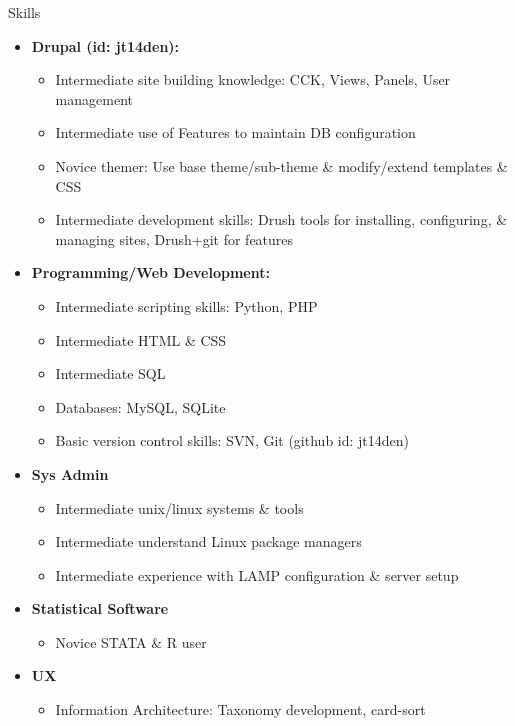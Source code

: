 \documentclass[11pt,oneside]{article}
\newenvironment{ressection}[1]{
	\vspace{4pt}
	{\fontfamily{phv}\selectfont\Large#1}
	\begin{itemize}
	\vspace{3pt}
}{
	\end{itemize}
}
\newcommand{\resitem}[1]{
	\vspace{-4pt}
	\item \begin{flushleft} #1 \end{flushleft}
}
\newcommand{\ressubitem}[1]{
	\vspace{-1pt}
	\item \begin{flushleft} #1 \end{flushleft}
}
\newenvironment{reslist}[1]{
	\resitem{\textbf{#1}}
	\vspace{-5pt}
	\begin{itemize}
}{
	\end{itemize}
}
\begin{document}
\begin{ressection}{Skills}

	\begin{reslist}{Drupal (id: jt14den):}

		\ressubitem{Intermediate site building knowledge: CCK, Views, Panels, User management }

        \ressubitem{Intermediate use of Features to maintain DB configuration}

		\ressubitem{Novice themer: Use base theme/sub-theme \& modify/extend templates \& CSS}

    \ressubitem{Intermediate development skills: Drush tools for installing, configuring, \& managing sites, Drush+git for features}
    
	\end{reslist}

	\begin{reslist}{Programming/Web Development:}

		\ressubitem{Intermediate scripting skills: Python, PHP}

		\ressubitem{Intermediate HTML \& CSS}
		
		\ressubitem{Intermediate SQL}
		
		\ressubitem{Databases: MySQL, SQLite}
		
		\ressubitem{Basic version control skills: SVN, Git (github id: jt14den)}

	\end{reslist}
	
	\begin{reslist}{Sys Admin}
	
	  \ressubitem{Intermediate unix/linux systems \& tools}
	  
    \ressubitem{Intermediate understand Linux package managers}
    
    \ressubitem{Intermediate experience with LAMP configuration \& server setup}
	
	\end{reslist}
	
	\begin{reslist}{Statistical Software}
	
	  \ressubitem{Novice STATA \& R user}
	  
	\end{reslist}
	
  \begin{reslist}{UX}
	
	  \ressubitem{Information Architecture: Taxonomy development, card-sort}
  

\end{reslist}
\end{ressection}
\end{document}
